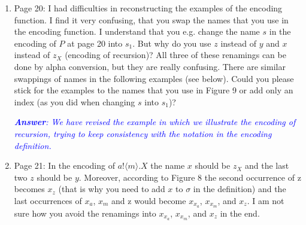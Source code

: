 \documentclass[11pt,a4paper]{article}
\newcommand{\answ}[1]{\smallskip \emph{\textcolor{blue}{\textbf{Answer}:  #1}}}
\newcommand{\checkthis}{}
\begin{document}
\begin{enumerate}
  Please correct me if I am wrong. I think that in the first
  case (output of a name) you need to require that $x$ and $z$ are different from $w$.
  In the second case (input of a name) you need that $y$ is different from $s$ and
  does not occur in $Q$. In the second but last case (recursion) you need that $X$
  is not already in $f$ and, I think, also that $y$ is different from $z_X$ and $s$.
  
  Moreover, if I compare this encoding function for the last two cases of
  recursion and recursion variables with the example presented later, I had the
  impression that you need to use $||\tilde{n}||$ instead of $\tilde{n}$ in the
  encoding of recursion and to use $\tilde{n}$ instead of $||\tilde{n}||$ in the
  encoding of recursion variables. Can you please check this once more.
  
  \answ{Both encodings are correct. The encoding of $\mu X. P$ is correct because we use variables $||\tilde{n}||$ in the abstraction, whereas the encoding of $X$ is correct because we use names $\tilde{n}$ in the application. Notice that the encoding of the recursion variable $X$ has been simplified in this revision.}
  \checkthis
  
\item Page 20: I had difficulties in reconstructing the examples of the encoding
  function. I find it very confusing, that you swap the names that you use in
  the encoding function. I understand that you e.g. change the name $s$ in the
  encoding of $P$ at page 20 into $s_1$. But why do you use $z$ instead of $y$ and $x$
  instead of $z_X$ (encoding of recursion)? All three of these renamings can be
  done by alpha conversion, but they are really confusing. There are similar
  swappings of names in the following examples (see below). Could you please
  stick for the examples to the names that you use in Figure 9 or add only an
  index (as you did when changing $s$ into $s_1$)?
  
  \answ{We have revised the example in which we illustrate the encoding of recursion, trying to keep consistency with the notation in the encoding definition.} \checkthis
  
\item  Page 21: In the encoding of $a!\langle m \rangle.X$ the name $x$ should be $z_X$ and the last two
  $z$ should be $y$. Moreover, according to Figure 8 the second occurrence of z
  becomes $x_z$ (that is why you need to add $x$ to $\sigma$ in the definition) and
  the last occurrences of $x_a$, $x_m$ and z would become $x_{x_a}$, $x_{x_m}$, and $x_z$.
  I am not sure how you avoid the renamings into $x_{x_a}$, $x_{x_m}$, and $x_z$ in the
  end.
  

\end{enumerate}
\end{document}
